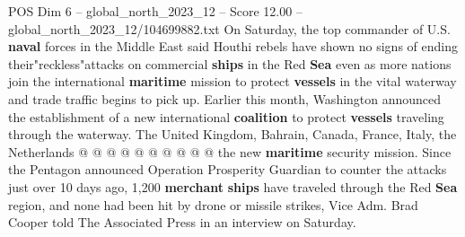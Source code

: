 \begin{textsample}{POS Dim 6 – global\_north\_2023\_12 – Score 12.00 – global\_north\_2023\_12/104699882.txt}
On Saturday, the top commander of U.S. \textbf{naval} forces in the Middle East said Houthi rebels have shown no signs of ending their"reckless"attacks on commercial \textbf{ships} in the Red \textbf{Sea} even as more nations join the international \textbf{maritime} mission to protect \textbf{vessels} in the vital waterway and trade traffic begins to pick up.
Earlier this month, Washington announced the establishment of a new international \textbf{coalition} to protect \textbf{vessels} traveling through the waterway.
The United Kingdom, Bahrain, Canada, France, Italy, the Netherlands @ @ @ @ @ @ @ @ @ @ the new \textbf{maritime} security mission.
Since the Pentagon announced Operation Prosperity Guardian to counter the attacks just over 10 days ago, 1,200 \textbf{merchant} \textbf{ships} have traveled through the Red \textbf{Sea} region, and none had been hit by drone or missile strikes, Vice Adm.
Brad Cooper told The Associated Press in an interview on Saturday.

\end{textsample}
